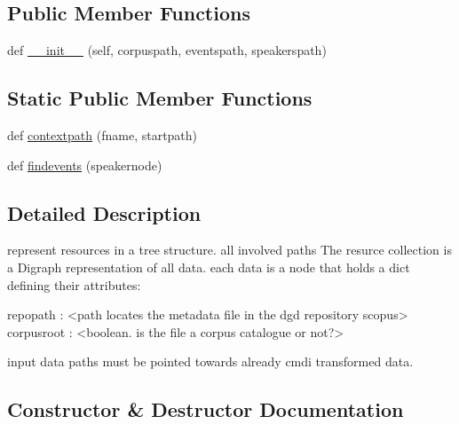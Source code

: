 \subsection*{Public Member Functions}
\begin{DoxyCompactItemize}
\item 
def \hyperlink{classbatchxslt_1_1cmdiresource_1_1_resource_tree_collection_a0233144a0c6519599b43b40a12d9ea35}{\+\_\+\+\_\+init\+\_\+\+\_\+} (self, corpuspath, eventspath, speakerspath)
\end{DoxyCompactItemize}
\subsection*{Static Public Member Functions}
\begin{DoxyCompactItemize}
\item 
def \hyperlink{classbatchxslt_1_1cmdiresource_1_1_resource_tree_collection_a56f3a1eca349d53c915c22fb119f0728}{contextpath} (fname, startpath)
\item 
def \hyperlink{classbatchxslt_1_1cmdiresource_1_1_resource_tree_collection_a2c66ca064180f421585f89a89770f222}{findevents} (speakernode)
\end{DoxyCompactItemize}


\subsection{Detailed Description}
\begin{DoxyVerb}represent resources in a tree structure. all involved paths
The resurce collection is a Digraph representation of all data.
each data is a node that holds a dict defining their attributes:

repopath : <path locates the metadata file in the dgd repository scopus>
corpusroot : <boolean. is the file a corpus catalogue or not?>

input data paths must be pointed towards already cmdi transformed data.
\end{DoxyVerb}
 

\subsection{Constructor \& Destructor Documentation}
\hypertarget{classbatchxslt_1_1cmdiresource_1_1_resource_tree_collection_a0233144a0c6519599b43b40a12d9ea35}{}
